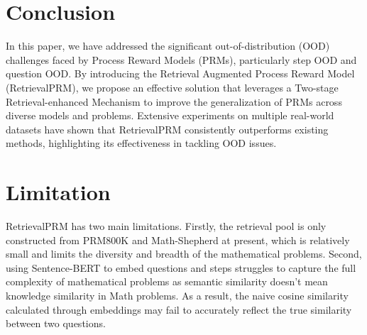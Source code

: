 \section{Conclusion}
In this paper, we have addressed the significant out-of-distribution (OOD) challenges faced by Process Reward Models (PRMs), particularly step OOD and question OOD. By introducing the Retrieval Augmented Process Reward Model (RetrievalPRM), we propose an effective solution that leverages a Two-stage Retrieval-enhanced Mechanism to improve the generalization of PRMs across diverse models and problems. Extensive experiments on multiple real-world datasets have shown that RetrievalPRM consistently outperforms existing methods, highlighting its effectiveness in tackling OOD issues. 

\section{Limitation}
RetrievalPRM has two main limitations. Firstly, the retrieval pool is only constructed from PRM800K and Math-Shepherd at present, which is relatively small and limits the diversity and breadth of the mathematical problems. Second, using Sentence-BERT to embed questions and steps struggles to capture the full complexity of mathematical problems as semantic similarity doesn't mean knowledge similarity in Math problems. As a result, the naive cosine similarity calculated through embeddings may fail to accurately reflect the true similarity between two questions.